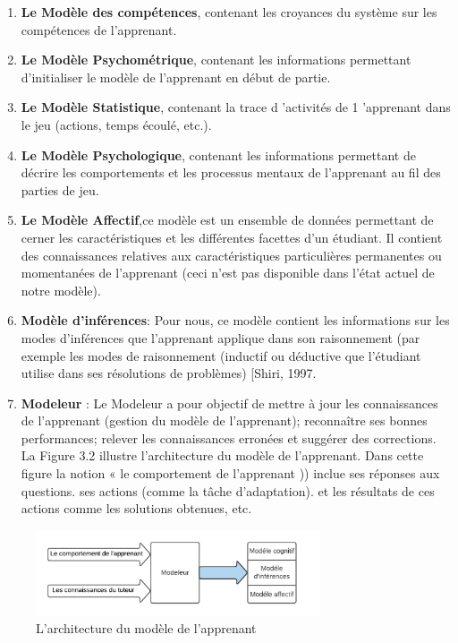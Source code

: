 \begin{enumerate}
\item  \textbf{Le Modèle des compétences}, contenant les croyances du système sur les compétences de l'apprenant. 
\item \textbf{Le Modèle Psychométrique}, contenant les informations permettant d'initialiser le modèle de l'apprenant en début de partie.
\item \textbf{Le Modèle Statistique}, contenant la trace d 'activités de 1 'apprenant dans le jeu (actions, temps écoulé, etc.).
\item \textbf{Le Modèle Psychologique}, contenant les informations permettant de décrire les comportements et les processus mentaux de l'apprenant au fil des parties de jeu. 
\item \textbf{Le Modèle Affectif},ce modèle est un ensemble de données permettant de cerner les caractéristiques et les différentes facettes d'un étudiant. Il contient des connaissances relatives aux caractéristiques particulières permanentes ou momentanées de l'apprenant (ceci n'est pas disponible dans l'état actuel de notre modèle). 
\item \textbf{Modèle d'inférences}: Pour nous, ce modèle contient les informations sur les modes d'inférences que l'apprenant applique dans son raisonnement (par exemple les modes de
raisonnement (inductif ou déductive que l'étudiant utilise dans ses résolutions de
problèmes) [Shiri, 1997.
\item \textbf{Modeleur} : Le Modeleur a pour objectif de mettre à jour les connaissances de l'apprenant (gestion du modèle de l'apprenant); reconnaître ses bonnes performances; relever les connaissances erronées et suggérer des corrections. La Figure 3.2 illustre l'architecture du modèle de l'apprenant. Dans cette figure la notion « le comportement de l'apprenant )) inclue ses réponses aux questions. ses actions (comme la tâche d'adaptation). et les résultats de ces actions comme les solutions obtenues, etc.
\end{enumerate}
\begin{figure}
    \centering
    \includegraphics[width=0.75\textwidth]{figures/md_inf.png}
    \captionsetup{justification=centering}
    \caption{ L'architecture du modèle de l'apprenant }
 \label{fig:2}
\end{figure}
\\\


